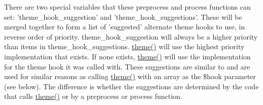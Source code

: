 There are two special variables that these preprocess and process functions can set: 'theme\_\-hook\_\-suggestion' and 'theme\_\-hook\_\-suggestions'. These will be merged together to form a list of 'suggested' alternate theme hooks to use, in reverse order of priority. theme\_\-hook\_\-suggestion will always be a higher priority than items in theme\_\-hook\_\-suggestions. \hyperlink{includes_2theme_8inc_a7c25609a935874541a19657affd30fff}{theme()} will use the highest priority implementation that exists. If none exists, \hyperlink{includes_2theme_8inc_a7c25609a935874541a19657affd30fff}{theme()} will use the implementation for the theme hook it was called with. These suggestions are similar to and are used for similar reasons as calling \hyperlink{includes_2theme_8inc_a7c25609a935874541a19657affd30fff}{theme()} with an array as the \$hook parameter (see below). The difference is whether the suggestions are determined by the code that calls \hyperlink{includes_2theme_8inc_a7c25609a935874541a19657affd30fff}{theme()} or by a preprocess or process function.


